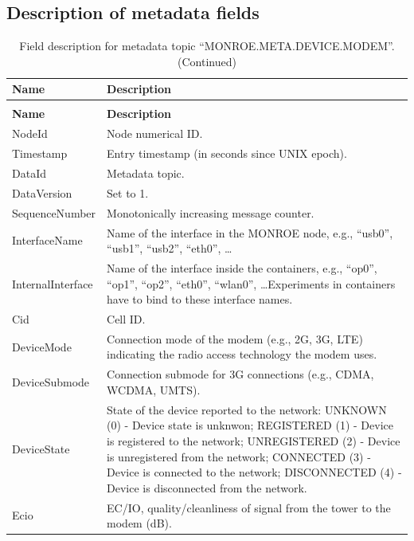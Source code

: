 \documentclass[a4paper,10pt]{article}
\newcommand{\monroe}{MONROE}
\begin{document}
\begin{appendices}
\section{Description of metadata fields}
\label{app:metadataFields}


{\scriptsize
\begin{longtable}{p{3cm}p{12cm}}
	\caption{Field description for metadata topic ``MONROE.META.DEVICE.MODEM''.}\label{tab:metaDeviceModem}\\
	\toprule
	\textbf{Name} & \textbf{Description} \\	\midrule
	\endfirsthead
	\caption{Field description for metadata topic ``MONROE.META.DEVICE.MODEM''. (Continued)}\\
	\toprule
	\textbf{Name} & \textbf{Description} \\	\midrule
	\endhead
	NodeId & Node numerical ID.\\
	Timestamp & Entry timestamp (in seconds since UNIX epoch).\\
	DataId & Metadata topic.\\
	DataVersion & Set to \num{1}.\\
	SequenceNumber & Monotonically increasing message counter.\\
	InterfaceName & Name of the interface in the \monroe{} node, e.g., ``usb0'', ``usb1'', ``usb2'', ``eth0'', \ldots\\
	InternalInterface & Name of the interface inside the containers, e.g., ``op0'', ``op1'', ``op2'', ``eth0'', ``wlan0'', \ldots Experiments in containers have to bind to these interface names.\\
	Cid & Cell ID.\\
	DeviceMode & Connection mode of the modem (e.g., 2G, 3G, LTE) indicating the radio access technology the modem uses.\\
	DeviceSubmode & Connection submode for 3G connections (e.g., CDMA, WCDMA, UMTS).\\
	DeviceState & State of the device reported to the network: UNKNOWN (0) - Device state is unknwon; REGISTERED (1) - Device is registered to the network; UNREGISTERED (2) - Device is unregistered from the network; CONNECTED (3) - Device is connected to the network; DISCONNECTED (4) - Device is disconnected from the network.\\
	Ecio & EC/IO, quality/cleanliness of signal from the tower to the modem (dB).\\

\end{longtable}}
\end{appendices}
\end{document}
